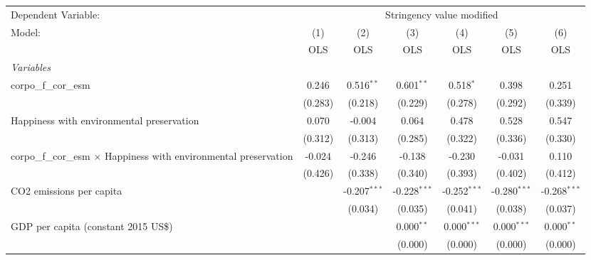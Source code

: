 
\begingroup
\centering
\begin{tabular}{lcccccc}
   \toprule
   Dependent Variable: & \multicolumn{6}{c}{Stringency value modified}\\
   Model:                                                                    & (1)     & (2)            & (3)            & (4)            & (5)            & (6)\\  
                                                                             &  OLS    & OLS            & OLS            & OLS            & OLS            & OLS\\  
   \midrule
   \emph{Variables}\\
   corpo\_f\_cor\_esm                                                        & 0.246   & 0.516$^{**}$   & 0.601$^{**}$   & 0.518$^{*}$    & 0.398          & 0.251\\   
                                                                             & (0.283) & (0.218)        & (0.229)        & (0.278)        & (0.292)        & (0.339)\\   
   Happiness with environmental preservation                                 & 0.070   & -0.004         & 0.064          & 0.478          & 0.528          & 0.547\\   
                                                                             & (0.312) & (0.313)        & (0.285)        & (0.322)        & (0.336)        & (0.330)\\   
   corpo\_f\_cor\_esm $\times$ Happiness with environmental preservation     & -0.024  & -0.246         & -0.138         & -0.230         & -0.031         & 0.110\\   
                                                                             & (0.426) & (0.338)        & (0.340)        & (0.393)        & (0.402)        & (0.412)\\   
   CO2 emissions per capita                                                  &         & -0.207$^{***}$ & -0.228$^{***}$ & -0.252$^{***}$ & -0.280$^{***}$ & -0.268$^{***}$\\   
                                                                             &         & (0.034)        & (0.035)        & (0.041)        & (0.038)        & (0.037)\\   
   GDP per capita (constant 2015 US\$)                                       &         &                & 0.000$^{**}$   & 0.000$^{***}$  & 0.000$^{***}$  & 0.000$^{**}$\\   
                                                                             &         &                & (0.000)        & (0.000)        & (0.000)        & (0.000)\\   

\end{tabular}
